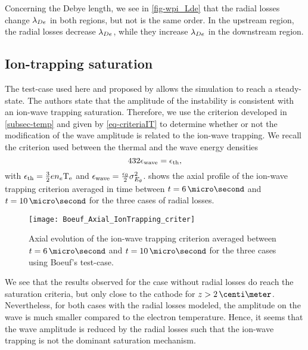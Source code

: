 Concerning the Debye length, we see in \cref{fig-wpi_Lde} that the radial losses change $\lambda_{De}$ in both regions, but not is the same order.
In the upstream region, the radial losses decrease $\lambda_{De}$, while they increase $\lambda_{De}$ in the downstream region.


\subsection{Ion-trapping saturation } \label{subsec-boeuf_iontrapping}

The test-case used here and proposed by \citet{boeuf2018} allows the simulation to reach a steady-state.
The authors state that the amplitude of the instability is consistent with an ion-wave trapping saturation.
Therefore, we use the criterion developed in \cref{subsec-temp} and given by \cref{eq-criteriaIT} to determine whether or not the modification of the wave amplitude is related to the ion-wave trapping.
We recall the criterion used between the thermal and the wave energy densities
\begin{equation} 
  432 \epsilon_{\rm wave} = \epsilon_{\rm th},
\end{equation}
with $\epsilon_{\rm th} = \frac{3}{2} e n_e \mathrm{T_e}$ and $\epsilon_{\rm wave} = \frac{\epsilon_0}{2} \sigma_{E_{\theta}}^2$.
 shows the axial profile of the ion-wave trapping criterion averaged in time between $t=6\,\micro\second$ and $t=10\,\micro\second$ for the three cases of radial losses.

\begin{figure}[hbt]
  \centering
  \texttt{[image: Boeuf\_Axial\_IonTrapping\_criter]}
  \caption{Axial evolution of the ion-wave trapping criterion averaged between $t=6\,\micro\second$ and $t=10\,\micro\second$ for the three cases using Boeuf's test-case. }
  \label{fig-ionwavetrapping_axial}
\end{figure}

We see that the results observed for the case without radial losses do reach the saturation criteria, but only close to the cathode for $z > 2\,\centi\meter$.
Nevertheless, for both cases with the radial losses modeled, the amplitude on the wave is much smaller compared to the electron temperature.
Hence, it seems that the wave amplitude is reduced by the radial losses such that the ion-wave trapping is not the dominant saturation mechanism.



